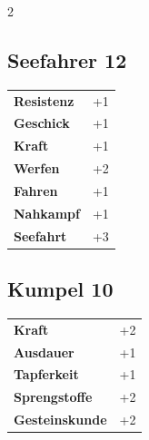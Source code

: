 \begin{multicols}{2}
\begin{tcolorbox}
    \subsection*{Seefahrer \hfill \small{12 }}
    \tcblower




\begin{tabular}{@{}ll@{}}
    \textbf{Resistenz} & +1\\
    \textbf{Geschick} & +1\\
    \textbf{Kraft} & +1\\
    \textbf{Werfen} & +2\\
    \textbf{Fahren} & +1\\
    \textbf{Nahkampf} & +1\\
    \textbf{Seefahrt} & +3\\
\end{tabular}


\end{tcolorbox}

\begin{tcolorbox}
    \subsection*{Kumpel \hfill \small{10 }}
    \tcblower




\begin{tabular}{@{}ll@{}}
    \textbf{Kraft} & +2\\
    \textbf{Ausdauer} & +1\\
    \textbf{Tapferkeit} & +1\\
    \textbf{Sprengstoffe} & +2\\
    \textbf{Gesteinskunde} & +2\\
\end{tabular}



\end{tcolorbox}
\end{multicols}

